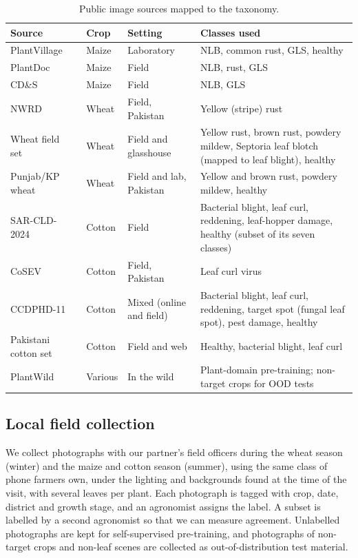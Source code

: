\begin{table}[H]
\centering\small
\caption{Public image sources mapped to the taxonomy.}
\label{tab:datasets}
\begin{tabularx}{\textwidth}{|L{3.6cm}|L{1.4cm}|L{2.6cm}|Y|}
\hline
\textbf{Source} & \textbf{Crop} & \textbf{Setting} & \textbf{Classes used} \\ \hline
PlantVillage~\cite{hughes2015plantvillage} & Maize & Laboratory & NLB, common rust, GLS, healthy \\ \hline
PlantDoc~\cite{singh2020plantdoc} & Maize & Field & NLB, rust, GLS \\ \hline
CD\&S~\cite{ahmad2021cds} & Maize & Field & NLB, GLS \\ \hline
NWRD~\cite{anwar2023nwrd} & Wheat & Field, Pakistan & Yellow (stripe) rust \\ \hline
Wheat field set~\cite{long2024ukwheat} & Wheat & Field and glasshouse & Yellow rust, brown rust, powdery mildew, Septoria leaf blotch (mapped to leaf blight), healthy \\ \hline
Punjab/KP wheat~\cite{malik2025wheatpk} & Wheat & Field and lab, Pakistan & Yellow and brown rust, powdery mildew, healthy \\ \hline
SAR-CLD-2024~\cite{sarcld2024} & Cotton & Field & Bacterial blight, leaf curl, reddening, leaf-hopper damage, healthy (subset of its seven classes) \\ \hline
CoSEV~\cite{noon2023cosev} & Cotton & Field, Pakistan & Leaf curl virus \\ \hline
CCDPHD-11~\cite{wang2025cotton} & Cotton & Mixed (online and field) & Bacterial blight, leaf curl, reddening, target spot (fungal leaf spot), pest damage, healthy \\ \hline
Pakistani cotton set~\cite{anwarcotton2023pk} & Cotton & Field and web & Healthy, bacterial blight, leaf curl \\ \hline
PlantWild~\cite{wei2024plantwild} & Various & In the wild & Plant-domain pre-training; non-target crops for OOD tests \\ \hline
\end{tabularx}
\end{table}

\subsection{Local field collection}
We collect photographs with our partner's field officers during the wheat season (winter) and the maize and cotton season (summer), using the same class of phone farmers own, under the lighting and backgrounds found at the time of the visit, with several leaves per plant. Each photograph is tagged with crop, date, district and growth stage, and an agronomist assigns the label. A subset is labelled by a second agronomist so that we can measure agreement. Unlabelled photographs are kept for self-supervised pre-training, and photographs of non-target crops and non-leaf scenes are collected as out-of-distribution test material.

